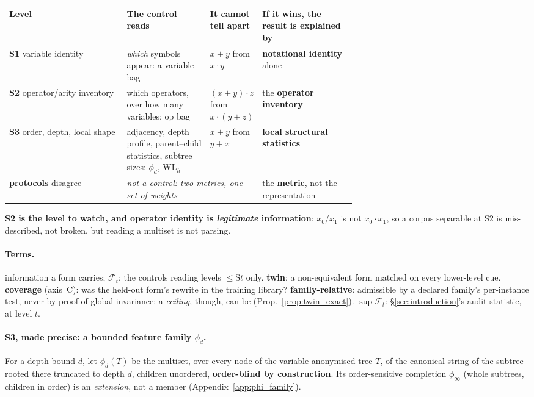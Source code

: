 \begin{center}\footnotesize
\setlength{\tabcolsep}{4pt}
\begin{tabular}{@{}l p{0.245\linewidth} p{0.145\linewidth} p{0.275\linewidth}@{}}
\toprule
Level & The control reads & It cannot tell apart & \textbf{If it wins}, the result is explained by \\
\midrule
\textbf{S1} variable identity & \emph{which} symbols appear: a variable bag & $x{+}y$ from $x{\cdot}y$ & \textbf{notational identity} alone \\
\textbf{S2} operator/arity inventory & which operators, over how many variables: op bag & $(x{+}y){\cdot}z$ from $x{\cdot}(y{+}z)$ & the \textbf{operator inventory} \\
\textbf{S3} order, depth, local shape & adjacency, depth profile, parent--child statistics, subtree sizes: $\phi_d$, $\mathrm{WL}_h$ & $x{+}y$ from $y{+}x$ & \textbf{local structural statistics} \\
\midrule
\textbf{protocols} disagree & \multicolumn{2}{l}{\emph{not a control: two metrics, one set of weights}} & the \textbf{metric}, not the representation \\
\bottomrule
\end{tabular}
\end{center}
\noindent \textbf{S2 is the level to watch, and operator identity is \emph{legitimate} information}: $x_0/x_1$ is not $x_0\cdot x_1$, so a corpus separable at S2 is mis-described, not broken, but reading a multiset is not parsing.

\paragraph{Terms.}
\begin{description}[noitemsep,topsep=1pt,leftmargin=1.2em]
  \item[cue] information a form carries; \textbf{\boldmath$\mathcal{F}_t$}: the controls reading levels ${\leq}\mathrm{S}t$ only. \textbf{twin}: a non-equivalent form matched on every lower-level cue. \textbf{coverage} (axis~C): was the held-out form's rewrite in the training library? \textbf{family-relative}: admissible by a declared family's per-instance test, never by proof of global invariance; a \emph{ceiling}, though, can be (Prop.~\ref{prop:twin_exact}). \textbf{\boldmath$\sup\mathcal{F}_t$}: \S\ref{sec:introduction}'s audit statistic, at level $t$.
\end{description}

\paragraph{S3, made precise: a bounded feature family $\phi_d$.} For a depth bound $d$, let $\phi_d(T)$ be the multiset, over every node of the variable-anonymised tree $T$, of the canonical string of the subtree rooted there truncated to depth $d$, children unordered, \textbf{order-blind by construction}. Its order-sensitive completion $\phi_\infty$ (whole subtrees, children in order) is an \emph{extension}, not a member (Appendix~\ref{app:phi_family}).

